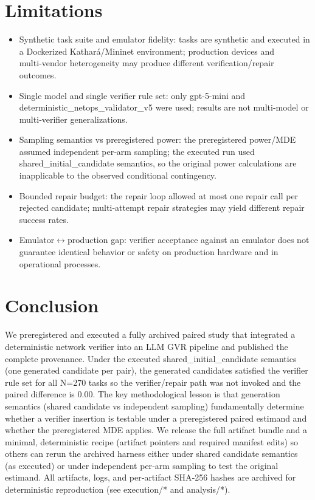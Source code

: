 \documentclass[conference]{IEEEtran}
\begin{document}
\section{Limitations}
\begin{itemize}
\item Synthetic task suite and emulator fidelity: tasks are synthetic and executed in a Dockerized Kathará/Mininet environment; production devices and multi‑vendor heterogeneity may produce different verification/repair outcomes.
\item Single model and single verifier rule set: only gpt-5-mini and deterministic\_netops\_validator\_v5 were used; results are not multi‑model or multi‑verifier generalizations.
\item Sampling semantics vs preregistered power: the preregistered power/MDE assumed independent per‑arm sampling; the executed run used shared\_initial\_candidate semantics, so the original power calculations are inapplicable to the observed conditional contingency.
\item Bounded repair budget: the repair loop allowed at most one repair call per rejected candidate; multi‑attempt repair strategies may yield different repair success rates.
\item Emulator\ensuremath{\leftrightarrow}production gap: verifier acceptance against an emulator does not guarantee identical behavior or safety on production hardware and in operational processes.
\end{itemize}

\section{Conclusion}
We preregistered and executed a fully archived paired study that integrated a deterministic network verifier into an LLM GVR pipeline and published the complete provenance. Under the executed shared\_initial\_candidate semantics (one generated candidate per pair), the generated candidates satisfied the verifier rule set for all N=270 tasks so the verifier/repair path was not invoked and the paired difference is 0.00. The key methodological lesson is that generation semantics (shared candidate vs independent sampling) fundamentally determine whether a verifier insertion is testable under a preregistered paired estimand and whether the preregistered MDE applies. We release the full artifact bundle and a minimal, deterministic recipe (artifact pointers and required manifest edits) so others can rerun the archived harness either under shared candidate semantics (as executed) or under independent per‑arm sampling to test the original estimand. All artifacts, logs, and per‑artifact SHA‑256 hashes are archived for deterministic reproduction (see execution/* and analysis/*).
\end{document}
